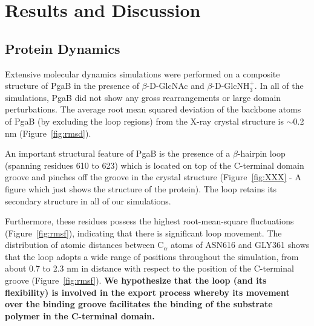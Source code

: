 \section{Results and Discussion}

\subsection{Protein Dynamics}

Extensive molecular dynamics simulations were performed on a composite structure of PgaB in the presence of $\beta$-D-GlcNAc and $\beta$-D-GlcNH$_{3}^{+}$. In all of the simulations, PgaB did not show any gross rearrangements or large domain perturbations. The average root mean squared deviation of the backbone atoms of PgaB (by excluding the loop regions) from the X-ray crystal structure is $\sim$0.2 nm (Figure~\ref{fig:rmsd}).

An important structural feature of PgaB is the presence of a $\beta$-hairpin loop (spanning residues 610 to 623) which is located on top of the C-terminal domain groove and pinches off the groove in the crystal structure (Figure~\ref{fig:XXX} - A figure which just shows the structure of the protein). The loop retains its secondary structure in all of our simulations.

Furthermore, these residues possess the highest root-mean-square fluctuations (Figure~\ref{fig:rmsf}), indicating that there is significant loop movement. The distribution of atomic distances between C$_\alpha$ atoms of ASN616 and GLY361 shows that the loop adopts a wide range of positions throughout the simulation, from about 0.7 to 2.3 nm in distance with respect to the position of the C-terminal groove (Figure~\ref{fig:rmsf}). \textbf{We hypothesize that the loop (and its flexibility) is involved in the export process whereby its movement over the binding groove facilitates the binding of the substrate polymer in the C-terminal domain.}

